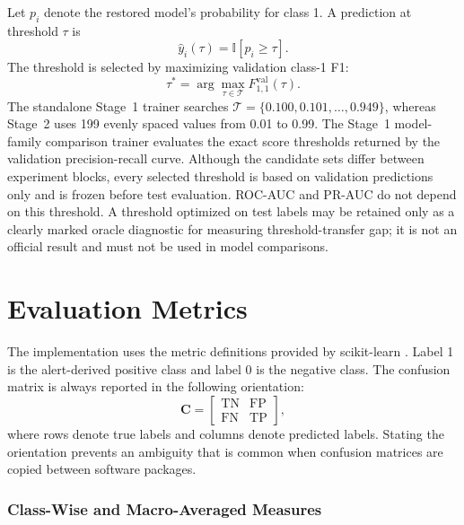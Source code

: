 Let $p_i$ denote the restored model's probability for class 1. A prediction at
threshold $\tau$ is
\begin{equation}
    \widehat{y}_i(\tau)=\mathbb{I}[p_i\geq\tau].
    \label{eq:experimental_decision_rule}
\end{equation}
The threshold is selected by maximizing validation class-1 F1:
\begin{equation}
    \tau^{*}=\arg\max_{\tau\in\mathcal{T}}
    F_{1,1}^{\mathrm{val}}(\tau).
    \label{eq:validation_threshold_selection}
\end{equation}
The standalone Stage~1 trainer searches
$\mathcal{T}=\{0.100,0.101,\ldots,0.949\}$, whereas Stage~2 uses 199 evenly
spaced values from 0.01 to 0.99. The Stage~1 model-family comparison trainer
evaluates the exact score thresholds returned by the validation
precision-recall curve. Although the candidate sets differ between experiment
blocks, every selected threshold is based on validation predictions only and
is frozen before test evaluation. ROC-AUC and PR-AUC do not depend on this
threshold. A threshold optimized on test labels may be retained only as a
clearly marked oracle diagnostic for measuring threshold-transfer gap; it is
not an official result and must not be used in model comparisons.

\section{Evaluation Metrics}
\label{subsec:experimental_metrics}

The implementation uses the metric definitions provided by scikit-learn
\cite{Pedregosa2011ScikitLearn}. Label 1 is the alert-derived positive class and
label 0 is the negative class. The confusion matrix is always reported in the
following orientation:
\begin{equation}
    \mathbf{C}=
    \begin{bmatrix}
        \mathrm{TN} & \mathrm{FP}\\
        \mathrm{FN} & \mathrm{TP}
    \end{bmatrix},
    \label{eq:experimental_confusion_matrix}
\end{equation}
where rows denote true labels and columns denote predicted labels. Stating the
orientation prevents an ambiguity that is common when confusion matrices are
copied between software packages.

\subsubsection{Class-Wise and Macro-Averaged Measures}
\label{subsubsec:macro_metrics}

